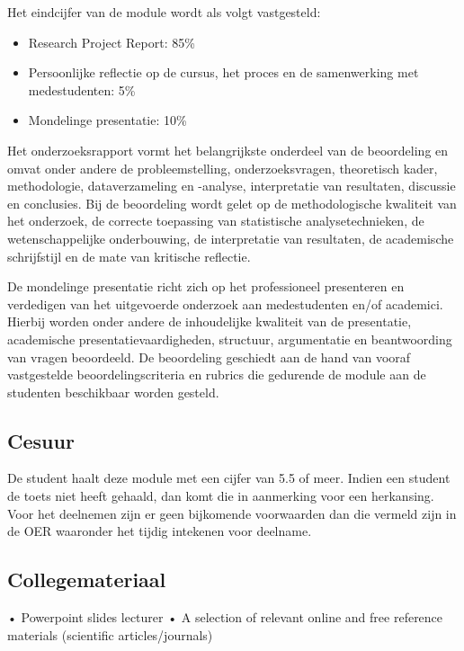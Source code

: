 \documentclass[
  letterpaper,
  DIV=11,
  numbers=noendperiod]{scrreprt}
\providecommand{\tightlist}{%
  \setlength{\itemsep}{0pt}\setlength{\parskip}{0pt}}
\begin{document}
Het eindcijfer van de module wordt als volgt vastgesteld:

\begin{itemize}
\tightlist
\item
  Research Project Report: 85\%
\item
  Persoonlijke reflectie op de cursus, het proces en de samenwerking met
  medestudenten: 5\%
\item
  Mondelinge presentatie: 10\%
\end{itemize}

Het onderzoeksrapport vormt het belangrijkste onderdeel van de
beoordeling en omvat onder andere de probleemstelling, onderzoeksvragen,
theoretisch kader, methodologie, dataverzameling en -analyse,
interpretatie van resultaten, discussie en conclusies. Bij de
beoordeling wordt gelet op de methodologische kwaliteit van het
onderzoek, de correcte toepassing van statistische analysetechnieken, de
wetenschappelijke onderbouwing, de interpretatie van resultaten, de
academische schrijfstijl en de mate van kritische reflectie.

De mondelinge presentatie richt zich op het professioneel presenteren en
verdedigen van het uitgevoerde onderzoek aan medestudenten en/of
academici. Hierbij worden onder andere de inhoudelijke kwaliteit van de
presentatie, academische presentatievaardigheden, structuur,
argumentatie en beantwoording van vragen beoordeeld. De beoordeling
geschiedt aan de hand van vooraf vastgestelde beoordelingscriteria en
rubrics die gedurende de module aan de studenten beschikbaar worden
gesteld.

\subsection*{Cesuur}\label{cesuur}

De student haalt deze module met een cijfer van 5.5 of meer. Indien een
student de toets niet heeft gehaald, dan komt die in aanmerking voor een
herkansing. Voor het deelnemen zijn er geen bijkomende voorwaarden dan
die vermeld zijn in de OER waaronder het tijdig intekenen voor deelname.

\subsection*{Collegemateriaal}\label{collegemateriaal}

• Powerpoint slides lecturer • A selection of relevant online and free
reference materials (scientific articles/journals)
\end{document}
